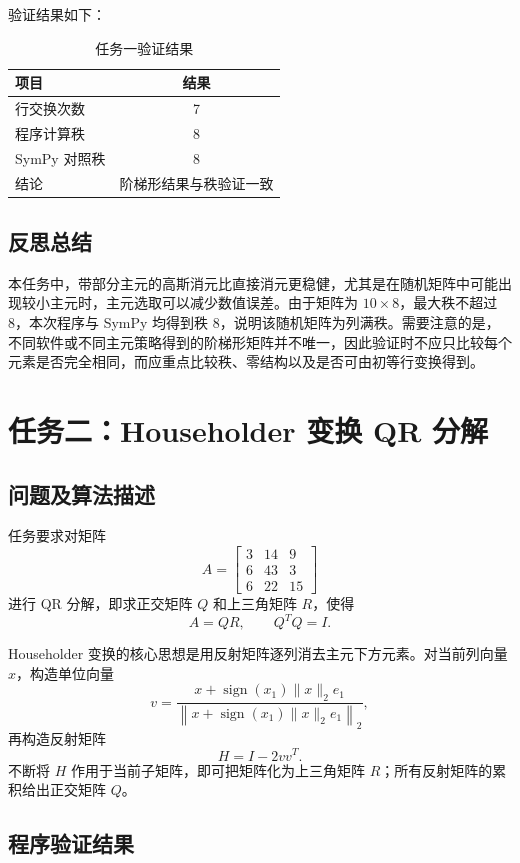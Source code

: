 \documentclass[UTF8,zihao=-4]{ctexart}
\begin{document}
验证结果如下：
\begin{table}[H]
\centering
\caption{任务一验证结果}
\begin{tabular}{lc}
\toprule
项目 & 结果 \\
\midrule
行交换次数 & 7 \\
程序计算秩 & 8 \\
SymPy 对照秩 & 8 \\
结论 & 阶梯形结果与秩验证一致 \\
\bottomrule
\end{tabular}
\end{table}

\subsection{反思总结}

本任务中，带部分主元的高斯消元比直接消元更稳健，尤其是在随机矩阵中可能出现较小主元时，主元选取可以减少数值误差。由于矩阵为 $10\times 8$，最大秩不超过 8，本次程序与 SymPy 均得到秩 8，说明该随机矩阵为列满秩。需要注意的是，不同软件或不同主元策略得到的阶梯形矩阵并不唯一，因此验证时不应只比较每个元素是否完全相同，而应重点比较秩、零结构以及是否可由初等行变换得到。

\section{任务二：Householder 变换 QR 分解}

\subsection{问题及算法描述}

任务要求对矩阵
\[
A=\begin{bmatrix}
3&14&9\\
6&43&3\\
6&22&15
\end{bmatrix}
\]
进行 QR 分解，即求正交矩阵 $Q$ 和上三角矩阵 $R$，使得
\[
    A=QR,\qquad Q^TQ=I.
\]

Householder 变换的核心思想是用反射矩阵逐列消去主元下方元素。对当前列向量 $x$，构造单位向量
\[
    v=\frac{x+\operatorname{sign}(x_1)\|x\|_2e_1}{\left\|x+\operatorname{sign}(x_1)\|x\|_2e_1\right\|_2},
\]
再构造反射矩阵
\[
    H=I-2vv^T.
\]
不断将 $H$ 作用于当前子矩阵，即可把矩阵化为上三角矩阵 $R$；所有反射矩阵的累积给出正交矩阵 $Q$。

\subsection{程序验证结果}
\end{document}
